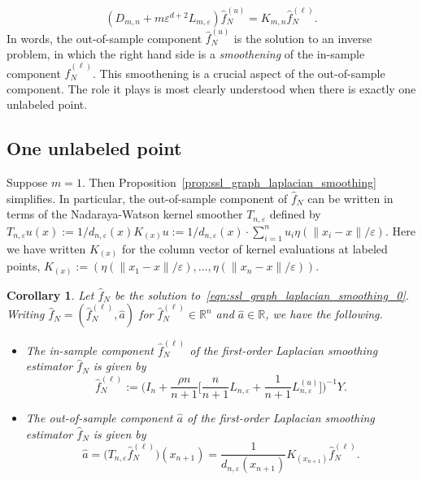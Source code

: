 \documentclass{article}
\newcommand{\Reals}{\mathbb{R}}
\newcommand{\1}{\mathbf{1}}
\newcommand{\wh}[1]{\widehat{#1}}
\theoremstyle{alden}
\theoremstyle{aldenthm}
\newtheorem{corollary}{Corollary}
\theoremstyle{definition}
\theoremstyle{remark}
\begin{document}
\begin{equation*}
(D_{m,n} + m\varepsilon^{d + 2}L_{m,\varepsilon})\wh{f}_N^{(u)} = K_{m,n} \wh{f}_N^{(\ell)}.
\end{equation*}
In words, the out-of-sample component $\wh{f}_N^{(u)}$ is the solution to an inverse problem, in which the right hand side is a \emph{smoothening} of the in-sample component $\wh{f}_N^{(\ell)}$. This smoothening is a crucial aspect of the out-of-sample component. The role it plays is most clearly understood when there is exactly one unlabeled point.

\subsection{One unlabeled point}
Suppose $m = 1$. Then Proposition~\ref{prop:ssl_graph_laplacian_smoothing} simplifies. In particular, the out-of-sample component of $\wh{f}_N$ can be written in terms of the Nadaraya-Watson kernel smoother $T_{n,\varepsilon}$ defined by $T_{n,\varepsilon}u(x) := 1/d_{n,\varepsilon}(x) K_{(x)} u :=  1/d_{n,\varepsilon}(x) \cdot \sum_{i = 1}^{n} u_i \eta(\|x_i - x\|/\varepsilon)$. Here we have written $K_{(x)}$ for the column vector of kernel evaluations at labeled points, $K_{(x)} := (\eta(\|x_1 - x\|/\varepsilon),\ldots,\eta(\|x_n - x\|/\varepsilon))$. 
\begin{corollary}
	\label{cor:ssl_graph_laplacian_smoothing_one_unlabeled}
	Let $\wh{f}_N$ be the solution to~\eqref{eqn:ssl_graph_laplacian_smoothing_0}. Writing $\wh{f}_N = (\wh{f}_N^{(\ell)},\wh{a})$ for $\wh{f}_N^{(\ell)} \in \Reals^n$ and $\wh{a} \in \Reals$, we have the following.
	\begin{itemize}
		\item The in-sample component $\wh{f}_N^{(\ell)}$ of the first-order Laplacian smoothing estimator $\wh{f}_N$ is given by
		\begin{equation}
		\label{eqn:ssl_graph_laplacian_smoothing_one_unlabeled_1}
		\wh{f}_N^{(\ell)} := \biggl(I_n + \frac{\rho n}{n + 1}\biggl[\frac{n}{n + 1}L_{n,\varepsilon} + \frac{1}{n + 1}L_{n,\varepsilon}^{(u)}\biggr]\biggr)^{-1} Y.
		\end{equation}
		\item The out-of-sample component $\wh{a}$ of the first-order Laplacian smoothing estimator $\wh{f}_N$ is given by
		\begin{equation}
		\label{eqn:ssl_graph_laplacian_smoothing_one_unlabeled_2}
		\wh{a} = \bigl(T_{n,\varepsilon}\wh{f}_N^{(\ell)}\bigr)(x_{n + 1}) = \frac{1}{d_{n,\varepsilon}(x_{n + 1})} K_{(x_{n + 1})}\wh{f}_N^{(\ell)}.
		\end{equation}
	\end{itemize}
\end{corollary}
\end{document}
